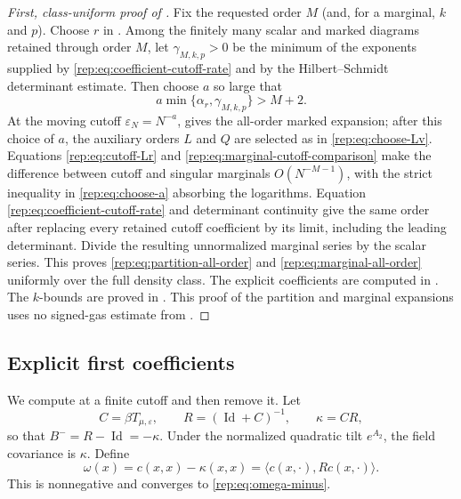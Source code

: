 \documentclass[11pt,reqno]{amsart}
\numberwithin{equation}{section}
\theoremstyle{plain}
\theoremstyle{definition}
\newcommand{\Id}{\operatorname{Id}}
\newcommand{\be}{\beta}
\newcommand{\vep}{\varepsilon}
\begin{document}
\begin{proof}[First, class-uniform proof of ]
Fix the requested order $M$ (and, for a marginal, $k$ and $p$).  Choose $r$ in .  Among the finitely many scalar and marked diagrams retained through order $M$, let $\gamma_{M,k,p}>0$ be the minimum of the exponents supplied by \eqref{rep:eq:coefficient-cutoff-rate} and by the Hilbert--Schmidt determinant estimate.  Then choose $a$ so large that
\begin{equation}\label{rep:eq:choose-a}
 a\min\{\alpha_r,\gamma_{M,k,p}\}>M+2.
\end{equation}
At the moving cutoff $\vep_N=N^{-a}$,  gives the all-order marked expansion; after this choice of $a$, the auxiliary orders $L$ and $Q$ are selected as in \eqref{rep:eq:choose-Lv}.  Equations \eqref{rep:eq:cutoff-Lr} and \eqref{rep:eq:marginal-cutoff-comparison} make the difference between cutoff and singular marginals $O(N^{-M-1})$, with the strict inequality in \eqref{rep:eq:choose-a} absorbing the logarithms.  Equation \eqref{rep:eq:coefficient-cutoff-rate} and determinant continuity give the same order after replacing every retained cutoff coefficient by its limit, including the leading determinant.  Divide the resulting unnormalized marginal series by the scalar series. This proves \eqref{rep:eq:partition-all-order} and \eqref{rep:eq:marginal-all-order} uniformly over the full density class. The explicit coefficients are computed in . The $k$-bounds are proved in .  This proof of the partition and marginal expansions uses no signed-gas estimate from .
\end{proof}

\subsection{Explicit first coefficients}\label{rep:sec:first-coefficients}

We compute at a finite cutoff and then remove it. Let
\begin{equation}\label{rep:eq:C-R-kappa}
 C=\be T_{\mu,\vep},\qquad
 R=(\Id+C)^{-1},\qquad
 \kappa=CR,
\end{equation}
so that $B^-=R-\Id=-\kappa$. Under the normalized quadratic tilt $e^{A_2}$, the field covariance is $\kappa$. Define
\begin{equation}\label{rep:eq:omega-finite}
 \omega(x)=c(x,x)-\kappa(x,x)
 =\langle c(x,\cdot),R c(x,\cdot)\rangle.
\end{equation}
This is nonnegative and converges to \eqref{rep:eq:omega-minus}.
\end{document}
